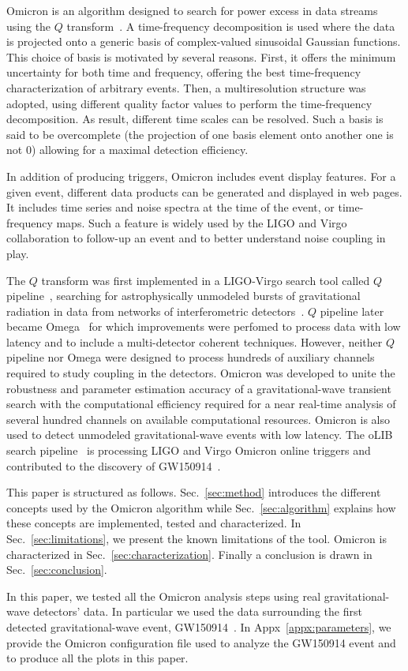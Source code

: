Omicron is an algorithm designed to search for power excess in data streams using the $Q$ transform~\cite{Brown:1991}. A time-frequency decomposition is used where the data is projected onto a generic basis of complex-valued sinusoidal Gaussian functions. This choice of basis is motivated by several reasons. First, it offers the minimum uncertainty for both time and frequency, offering the best time-frequency characterization of arbitrary events. Then, a multiresolution structure was adopted, using different quality factor values to perform the time-frequency decomposition. As result, different time scales can be resolved. Such a basis is said to be overcomplete (the projection of one basis element onto another one is not 0) allowing for a maximal detection efficiency.

In addition of producing triggers, Omicron includes event display features. For a given event, different data products can be generated and displayed in web pages. It includes time series and noise spectra at the time of the event, or time-frequency maps. Such a feature is widely used by the LIGO and Virgo collaboration to follow-up an event and to better understand noise coupling in play.

The $Q$ transform was first implemented in a LIGO-Virgo search tool called $Q$ pipeline~\cite{Chatterji:2004}, searching for astrophysically unmodeled bursts of gravitational radiation in data from networks of interferometric detectors~\cite{Abbott:2009zi,Abbott:2009up,Abadie:2010mt}. $Q$ pipeline later became Omega~\cite{Rollins:2011} for which improvements were perfomed to process data with low latency and to include a multi-detector coherent techniques. However, neither $Q$ pipeline nor Omega were designed to process hundreds of auxiliary channels required to study coupling in the detectors. Omicron was developed to unite the robustness and parameter estimation accuracy of a gravitational-wave transient search with the computational efficiency required for a near real-time analysis of several hundred channels on available computational resources. Omicron is also used to detect unmodeled gravitational-wave events with low latency. The oLIB search pipeline~\cite{Lynch:2015yin} is processing LIGO and Virgo Omicron online triggers and contributed to the discovery of GW150914~\cite{TheLIGOScientific:2016uux}.

This paper is structured as follows. Sec.~\ref{sec:method} introduces the different concepts used by the Omicron algorithm while Sec.~\ref{sec:algorithm} explains how these concepts are implemented, tested and characterized. In Sec.~\ref{sec:limitations}, we present the known limitations of the tool. Omicron is characterized in Sec.~\ref{sec:characterization}. Finally a conclusion is drawn in Sec.~\ref{sec:conclusion}.

In this paper, we tested all the Omicron analysis steps using real gravitational-wave detectors' data. In particular we used the data surrounding the first detected gravitational-wave event, GW150914~\cite{GW150914data}. In Appx~\ref{appx:parameters}, we provide the Omicron configuration file used to analyze the GW150914 event and to produce all the plots in this paper.




